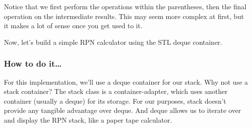 Notice that we first perform the operations within the parentheses, then the final operation on the intermediate results. This may seem more complex at first, but it makes a lot of sense once you get used to it.

Now, let's build a simple RPN calculator using the STL deque container.

\subsubsection{How to do it…}

For this implementation, we'll use a deque container for our stack. Why not use a stack container? The stack class is a container-adapter, which uses another container (usually a deque) for its storage. For our purposes, stack doesn't provide any tangible advantage over deque. And deque allows us to iterate over and display the RPN stack, like a paper tape calculator.

